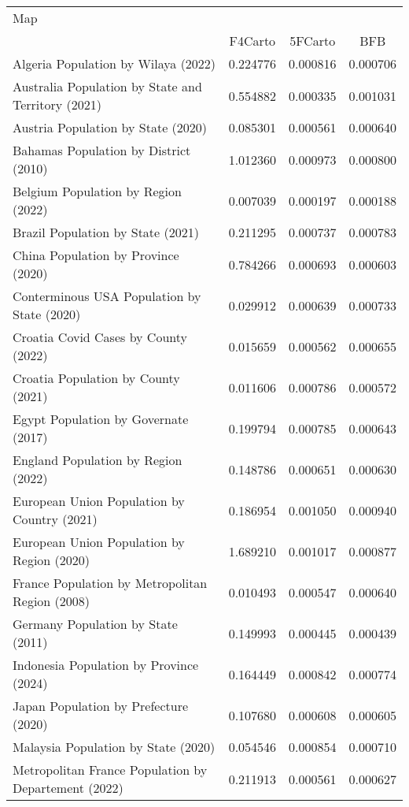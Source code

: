 \begin{tabular}{lccc}
\toprule
Map &  \\
\cmidrule(lr){2-4}
     & F4Carto & 5FCarto & BFB \\
\midrule

Algeria Population by Wilaya (2022) & 0.224776 & 0.000816 & 0.000706 \\
Australia Population by State and Territory (2021) & 0.554882 & 0.000335 & 0.001031 \\
Austria Population by State (2020) & 0.085301 & 0.000561 & 0.000640 \\
Bahamas Population by District (2010) & 1.012360 & 0.000973 & 0.000800 \\
Belgium Population by Region (2022) & 0.007039 & 0.000197 & 0.000188 \\
Brazil Population by State (2021) & 0.211295 & 0.000737 & 0.000783 \\
China Population by Province (2020) & 0.784266 & 0.000693 & 0.000603 \\
Conterminous USA Population by State (2020) & 0.029912 & 0.000639 & 0.000733 \\
Croatia Covid Cases by County (2022) & 0.015659 & 0.000562 & 0.000655 \\
Croatia Population by County (2021) & 0.011606 & 0.000786 & 0.000572 \\
Egypt Population by Governate (2017) & 0.199794 & 0.000785 & 0.000643 \\
England Population by Region (2022) & 0.148786 & 0.000651 & 0.000630 \\
European Union Population by Country (2021) & 0.186954 & 0.001050 & 0.000940 \\
European Union Population by Region (2020) & 1.689210 & 0.001017 & 0.000877 \\
France Population by Metropolitan Region (2008) & 0.010493 & 0.000547 & 0.000640 \\
Germany Population by State (2011) & 0.149993 & 0.000445 & 0.000439 \\
Indonesia Population by Province (2024) & 0.164449 & 0.000842 & 0.000774 \\
Japan Population by Prefecture (2020) & 0.107680 & 0.000608 & 0.000605 \\
Malaysia Population by State (2020) & 0.054546 & 0.000854 & 0.000710 \\
Metropolitan France Population by Departement (2022) & 0.211913 & 0.000561 & 0.000627 \\

\end{tabular}
